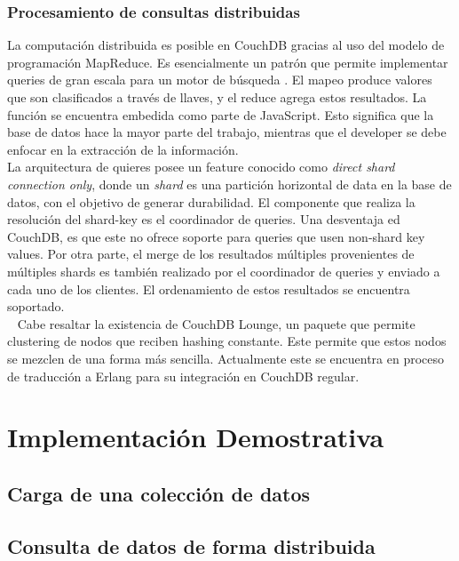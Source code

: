\documentclass{article}
\begin{document}
            \subsubsection{Procesamiento de consultas distribuidas}
                La computación distribuida es posible en CouchDB gracias al uso del modelo de programación MapReduce. Es esencialmente un patrón que permite implementar queries de gran escala para un motor de búsqueda \cite{sciabrra}. El mapeo produce valores que son clasificados a través de llaves, y el reduce agrega estos resultados. La función se encuentra embedida como parte de JavaScript. Esto significa que la base de datos hace la mayor parte del trabajo, mientras que el developer se debe enfocar en la extracción de la información. \\ 
                La arquitectura de quieres posee un feature conocido como \textit{direct shard connection only}, donde un \textit{shard} es una partición horizontal de data en la base de datos, con el objetivo de generar durabilidad. El componente que realiza la resolución del shard-key es el coordinador de queries. Una desventaja ed CouchDB, es que este no ofrece soporte para queries que usen non-shard key values. Por otra parte, el merge de los resultados múltiples provenientes de múltiples shards es también realizado por el coordinador de queries y enviado a cada uno de los clientes. El ordenamiento de estos resultados se encuentra soportado. \\ 
                Cabe resaltar la existencia de CouchDB Lounge, un paquete que permite clustering de nodos que reciben hashing constante. Este permite que estos nodos se mezclen de una forma más sencilla. Actualmente este se encuentra en proceso de traducción a Erlang para su integración en CouchDB regular. 
    \section{Implementación Demostrativa}
        \subsection{Carga de una colección de datos}
        \subsection{Consulta de datos de forma distribuida}
\end{document}

